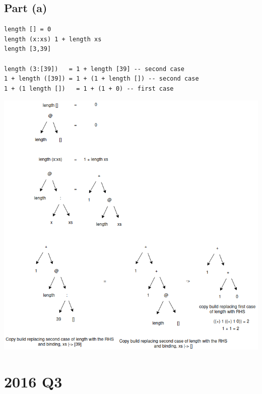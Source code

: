 \documentclass[11pt]{article}
\begin{document}
\subsection{Part (a)}
\label{sec:org4efbd37}
\begin{verbatim}
length [] = 0
length (x:xs) 1 + length xs
length [3,39]

length (3:[39])   = 1 + length [39] -- second case
1 + length ([39]) = 1 + (1 + length []) -- second case
1 + (1 length [])   = 1 + (1 + 0) -- first case
\end{verbatim}
\begin{center}
\includegraphics[width=160mm]{./length-xs.png}
\end{center}
\section{2016 Q3}
\label{sec:org112e908}
\end{document}
